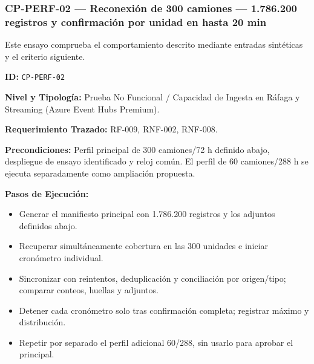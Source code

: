 \subsubsection*{CP-PERF-02 — Reconexión de 300 camiones — 1.786.200 registros y confirmación por unidad en hasta 20 min}\label{sec:9-cp-perf-02}

Este ensayo comprueba el comportamiento descrito mediante entradas sintéticas y el criterio siguiente.

\par\noindent\textbf{ID:} \texttt{CP-\allowbreak{}PERF-\allowbreak{}02}\par
\par\noindent\textbf{Nivel y Tipología:} Prueba No Funcional / Capacidad de Ingesta en Ráfaga y Streaming (Azure Event Hubs Premium).\par
\par\noindent\textbf{Requerimiento Trazado:} RF-009, RNF-002, RNF-008.\par
\par\noindent\textbf{Precondiciones:} Perfil principal de 300 camiones/72 h definido abajo, despliegue de ensayo identificado y reloj común. El perfil de 60 camiones/288 h se ejecuta separadamente como ampliación propuesta.\par
\par\noindent\textbf{Pasos de Ejecución:}\par
\begin{itemize}
\item Generar el manifiesto principal con 1.786.200 registros y los adjuntos definidos abajo.
\item Recuperar simultáneamente cobertura en las 300 unidades e iniciar cronómetro individual.
\item Sincronizar con reintentos, deduplicación y conciliación por origen/tipo; comparar conteos, huellas y adjuntos.
\item Detener cada cronómetro solo tras confirmación completa; registrar máximo y distribución.
\item Repetir por separado el perfil adicional 60/288, sin usarlo para aprobar el principal.
\end{itemize}


